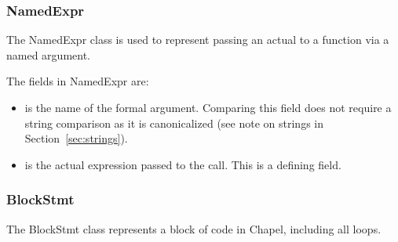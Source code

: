 \documentclass[10pt]{article}
\begin{document}
\subsubsection{NamedExpr}
\label{sec:namedexpr}

The NamedExpr class is used to represent passing an actual to a
function via a named argument.

The fields in NamedExpr are:
\begin{itemize}
\item {} is the name of the formal argument.
  Comparing this field does not require a string comparison as it is
  canonicalized (see note on strings in Section~\ref{sec:strings}).
\item {} is the actual expression passed to the call.
  This is a defining field.
\end{itemize}

\subsubsection{BlockStmt}
\label{sec:blockstmt}

The BlockStmt class represents a block of code in Chapel, including
all loops.
\end{document}
